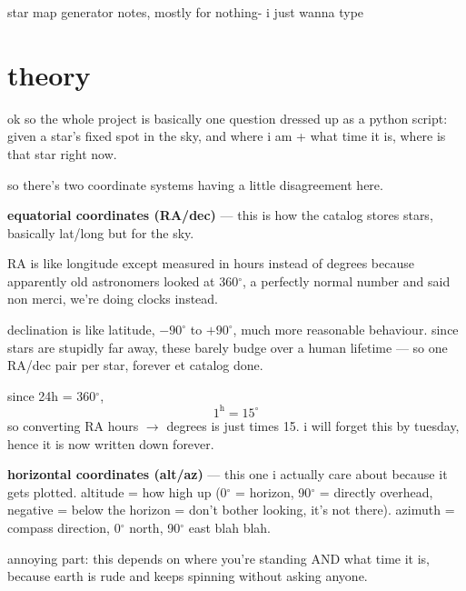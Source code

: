 \documentclass{article}
\begin{document}
star map generator notes, mostly for nothing- i just wanna type
\bigskip

\section{theory}

ok so the whole project is basically one question dressed up as a python script: given a star's fixed spot in the sky, and where i am + what time it is, where is that star right now.

so there's two coordinate systems having a little disagreement here.

\smallskip
\textbf{equatorial coordinates (RA/dec)} — this is how the catalog stores stars, basically lat/long but for the sky. 

RA is like longitude except measured in hours instead of degrees because apparently old astronomers looked at 360$^\circ$, a perfectly normal number and said non merci, we're doing clocks instead. 

declination is like latitude, $-90^\circ$ to $+90^\circ$, much more reasonable behaviour. since stars are stupidly far away, these barely budge over a human lifetime — so one RA/dec pair per star, forever et catalog done.
\medskip

since 24h = 360$^\circ$,
\begin{equation}
1^{\text{h}} = 15^\circ
\end{equation}
so converting RA hours $\to$ degrees is just times 15. i will forget this by tuesday, hence it is now written down forever.

\bigskip
\textbf{horizontal coordinates (alt/az)} — this one i actually care about because it gets plotted. altitude = how high up (0$^\circ$ = horizon, 90$^\circ$ = directly overhead, negative = below the horizon = don't bother looking, it's not there). azimuth = compass direction, 0$^\circ$ north, 90$^\circ$ east blah blah.

annoying part: this depends on where you're standing AND what time it is, because earth is rude and keeps spinning without asking anyone.
\end{document}
